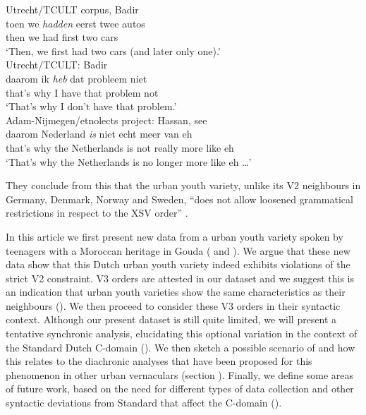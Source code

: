 \documentclass[output=paper]{langsci/langscibook}
\begin{document}
\ea
    \ea Utrecht/TCULT corpus, Badir\\
    \gll toen we \textit{hadden} eerst twee autos\\
    then we had first two cars\\
    \trans \enquote*{Then, we first had two cars (and later only one).}\\
    \ex Utrecht/TCULT: Badir\\
    \gll daarom ik \textit{heb} dat probleem niet\\
    {that's why} I have that problem not\\
    \trans \enquote*{That's why I don't have that problem.}\\
    \ex Adam-Nijmegen/etnolects project: Hassan, see \citet{Lukassen:2011}\\
    \gll daarom Nederland \textit{is} niet echt meer van eh\\
    {that's why} {the Netherlands} is not really more like eh\\
    \trans \enquote*{That's why the Netherlands is no longer more like eh \dots}
    \z
\z

\noindent They conclude from this that the  urban youth variety, unlike
its V2 neighbours in Germany, Denmark, Norway and Sweden, \enquote{does not
allow loosened grammatical restrictions in respect to the XSV order}
\citep[88]{Freywaldetal:2015}.

In this article we first present new data from a  urban youth variety
spoken by  teenagers with a Moroccan heritage in Gouda
( and ). We argue that these new data show that this
Dutch urban youth variety indeed exhibits violations of the strict V2
constraint. V3 orders are attested in our dataset and we suggest this is an
indication that  urban youth varieties show the same characteristics as
their  neighbours (). We then proceed to
consider these V3 orders in their syntactic context. Although our present
dataset is still quite limited, we will present a tentative synchronic
analysis, elucidating this optional variation in the context of the Standard
Dutch C-domain (). We then sketch a possible scenario of
 and how this relates to the diachronic analyses that have been
proposed for this phenomenon in other  urban vernaculars (section
). Finally, we define some areas of future work, based on the
need for different types of data collection and other syntactic deviations from
Standard  that affect the C-domain ().
\end{document}

